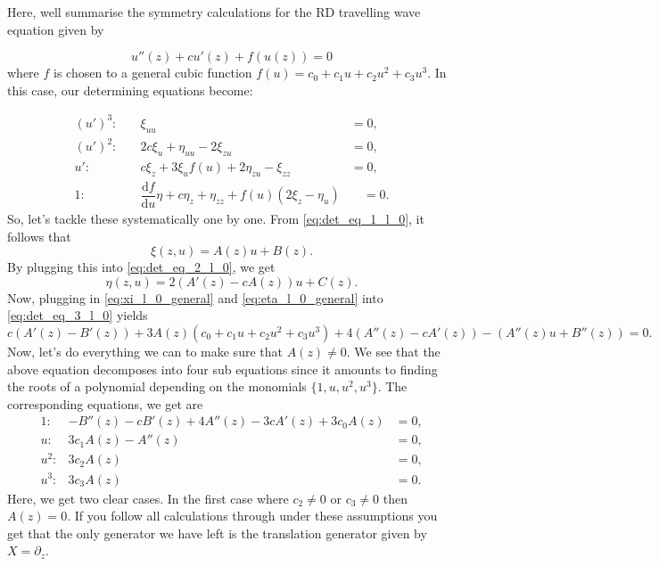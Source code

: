 Here, well summarise the symmetry calculations for the RD travelling wave equation given by

\begin{equation}
  u''(z)+cu'(z)+f(u(z))=0
  \label{eq:RD}
\end{equation}
where $f$ is chosen to a general cubic function $f(u)=c_0+c_1 u+c_2 u^2+c_3 u^3$. In this case, our determining equations become:

\begin{align}
(u')^3:&\quad\xi_{uu}&=0,\label{eq:det_eq_1_l_0}\\
(u')^2:&\quad 2c\xi_u+\eta_{uu}-2\xi_{zu}&=0,\label{eq:det_eq_2_l_0}\\
u':&\quad c\xi_z+3\xi_u f(u)+2\eta_{zu}-\xi_{zz}&=0,\label{eq:det_eq_3_l_0}\\
1:&\quad \dfrac{\mathrm{d}f}{\mathrm{d}u}\eta+c\eta_z+\eta_{zz}+f(u)(2\xi_z-\eta_u)&\quad=0.\label{eq:det_eq_4_l_0}
\end{align}
So, let's tackle these systematically one by one. From \eqref{eq:det_eq_1_l_0}, it follows that
\begin{equation}
\xi(z,u)=A(z)u+B(z).
\label{eq:xi_l_0_general}
\end{equation}
By plugging this into \eqref{eq:det_eq_2_l_0}, we get
\begin{equation}
\eta(z,u)=2(A'(z)-cA(z))u+C(z).
\label{eq:eta_l_0_general}
\end{equation}
Now, plugging in \eqref{eq:xi_l_0_general} and \eqref{eq:eta_l_0_general} into \eqref{eq:det_eq_3_l_0} yields
\begin{equation}
c(A'(z)-B'(z))+3A(z)(c_0+c_1 u + c_2 u^2 + c_3 u^3)+4(A''(z)-cA'(z))-(A''(z)u+B''(z))=0.
  \label{eq:det_eq_3_temp}
\end{equation}
Now, let's do everything we can to make sure that $A(z)\neq 0$. We see that the above equation decomposes into four sub equations since it amounts to finding the roots of a polynomial depending on the monomials $\{1,u,u^2,u^3\}$. The corresponding equations, we get are
\begin{align*}
  1:&-B''(z)-cB'(z)+4A''(z)-3cA'(z)+3c_{0}A(z)&=0,\\
  u:&3c_{1}A(z)-A''(z)&=0,\\
  u^2:&3c_{2}A(z)&=0,\\
  u^3:&3c_{3}A(z)&=0.    
\end{align*}
Here, we get two clear cases. In the first case where $c_2\neq 0$ or $c_3\neq 0$ then $A(z)=0$. If you follow all calculations through under these assumptions you get that the only generator we have left is the translation generator given by $X=\partial_z$.

